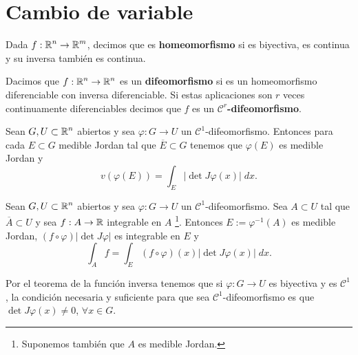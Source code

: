 \section{Cambio de variable}
\begin{definition}[Homeomorfismo]
Dada $\displaystyle f : \mathbb{R}^{n}\to \mathbb{R}^{m} $, decimos que es \textbf{homeomorfismo} si es biyectiva, es continua y su inversa también es continua.
\end{definition}

\begin{definition}[Difeomorfismo]
Dacimos que $\displaystyle f : \mathbb{R}^{n}\to \mathbb{R}^{n} $ es un \textbf{difeomorfismo} si es un homeomorfismo diferenciable con inversa diferenciable. Si estas aplicaciones son $\displaystyle r $ veces continuamente diferenciables decimos que $\displaystyle f $ es un $\displaystyle \mathcal{C}^{r} $\textbf{-difeomorfismo}. 
\end{definition}
\begin{prop}
Sean $\displaystyle G, U \subset \mathbb{R}^{n} $ abiertos y sea $\displaystyle \varphi: G \to U $ un $\displaystyle \mathcal{C}^{1} $-difeomorfismo. Entonces para cada $\displaystyle E \subset G $ medible Jordan tal que $\displaystyle \overline{E}\subset G $ tenemos que $\displaystyle \varphi\left(E\right) $ es medible Jordan y
\[v\left(\varphi\left(E\right)\right)=\int _{E} \left|\det J\varphi\left(x\right)\right| \; dx .\]
\end{prop}
\begin{theorem}
Sean $\displaystyle G, U \subset \mathbb{R}^{n} $ abiertos y sea $\displaystyle \varphi : G \to U $ un $\displaystyle \mathcal{C}^{1} $-difeomorfismo. Sea $\displaystyle A \subset U $ tal que $\displaystyle \overline{A}\subset U $ y sea $\displaystyle f : A \to \mathbb{R} $ integrable en $\displaystyle A $ \footnote{Suponemos también que $\displaystyle A $ es medible Jordan.}. Entonces $\displaystyle E :=\varphi^{-1}\left(A\right) $ es medible Jordan, $\displaystyle \left(f\circ\varphi\right) \left|\det J\varphi\right| $ es integrable en $\displaystyle E $ y
\[\int _{A}f =\int _{E}\left(f\circ \varphi\right)\left(x\right) \left|\det J\varphi\left(x\right)\right| \; dx .\]
\end{theorem}
\begin{observation}
Por el teorema de la función inversa tenemos que si $\displaystyle \varphi: G \to U $ es biyectiva y es $\displaystyle \mathcal{C}^{1} $, la condición necesaria y suficiente para que sea $\displaystyle \mathcal{C}^{1} $-difeomorfismo es que $\displaystyle \det J\varphi\left(x\right)\neq 0 $, $\displaystyle \forall x \in G $. 
\end{observation}
